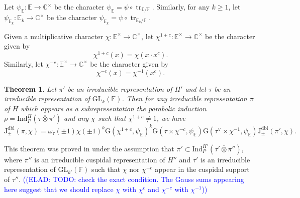\documentclass[12pt, reqno]{amsart}
\newtheorem{theorem}{Theorem}[section]
\theoremstyle{definition}
\theoremstyle{definition}
\theoremstyle{definition}
\newcommand{\cComplex}{\mathbb{C}}
\newcommand{\multiplicativegroup}[1]{#1^{\times}}
\newcommand{\fieldCharacter}{\psi}
\newcommand{\centralCharacter}[1]{\omega_{#1}}
\newcommand{\Ind}[3]{\mathrm{Ind}_{#1}^{#2}\left(#3\right)}
\newcommand{\Contragradient}[1]{#1^{\vee}}
\newcommand{\involution}[1]{#1^{c}}
\newcommand{\minusInvolution}[1]{#1^{-c}}
\newcommand{\involutionPlusOne}[1]{#1^{1+c}}
\newcommand{\trace}{\operatorname{tr}}
\newcommand{\GL}{\mathrm{GL}}
\newcommand{\finiteField}{\mathbb{F}}
\newcommand{\quadraticExtension}{\mathbb{E}}
\newcommand{\quadraticFieldExtension}[1]{\quadraticExtension_{#1}}
\newcommand{\GaussSumScalar}[2]{\mathrm{G}\left(#1, #2\right)}
\newcommand{\dblJacobiSumScalar}[2]{\mathrm{J}_{\pm}^{\mathrm{dbl}}\left(#1, #2\right)}
\newcommand{\elad}[1]{\textcolor{blue}{\sffamily ((ELAD: #1))}}
\begin{document}
Let $\fieldCharacter_{\quadraticExtension} \colon \quadraticExtension \to \multiplicativegroup{\cComplex}$ be the character  $\fieldCharacter_{\quadraticExtension} = \fieldCharacter \circ \trace_{\quadraticExtension \slash \finiteField}$. Similarly, for any $k \ge 1$, let $\fieldCharacter_{\quadraticFieldExtension{k}} \colon \quadraticFieldExtension{k} \to \multiplicativegroup{\cComplex}$ be the character $\fieldCharacter_{\quadraticFieldExtension{k}} = \fieldCharacter \circ \trace_{\quadraticFieldExtension{k} \slash \finiteField}$.

Given a multiplicative character $\chi \colon \multiplicativegroup{\quadraticExtension} \to \multiplicativegroup{\cComplex}$, let $\involutionPlusOne{\chi} \colon \multiplicativegroup{\quadraticExtension} \to \multiplicativegroup{\cComplex}$ be the character given by
$$\involutionPlusOne{\chi}\left(x\right) = \chi\left(x \cdot \involution{x}\right).$$ Similarly, let $\minusInvolution{\chi} \colon \multiplicativegroup{\quadraticExtension} \to \multiplicativegroup{\cComplex}$ be the character given by
$$\minusInvolution{\chi}\left(x\right) = \chi^{-1}\left(\involution{x}\right).$$

\begin{theorem}\label{thm:multiplicativity-in-terms-of-gauss-sums}
	Let $\pi'$ be an irreducible representation of $H'$ and let $\tau$ be an irreducible representation of $\GL_k\left(\quadraticExtension\right)$. Then for any irreducible representation $\pi$ of $H$ which appears as a subrepresentation the parabolic induction $\rho = \Ind{P}{H}{\tau \overline{\otimes} \pi'}$ and any $\chi$ such that $\involutionPlusOne{\chi} \ne 1$, we have
	$$\dblJacobiSumScalar{\pi}{\chi} = \centralCharacter{\tau}\left(\pm 1\right) \chi\left(\pm 1\right)^k \GaussSumScalar{\involutionPlusOne{\chi}}{\fieldCharacter_{\quadraticExtension}}^k \GaussSumScalar{\tau \times \minusInvolution{\chi}}{\fieldCharacter_{\quadraticExtension}} \GaussSumScalar{\Contragradient{\tau} \times \chi^{-1}}{\fieldCharacter_{\quadraticExtension}} \dblJacobiSumScalar{\pi'}{\chi}.$$
\end{theorem}

This theorem was proved in \cite{GirschZelingher2025} under the assumption that $\pi' \subset \Ind{P}{H'}{\tau' \overline{\otimes} \pi''}$, where $\pi''$ is an irreducible cuspidal representation of $H''$ and $\tau'$ is an irreducible representation of $\GL_{k'}\left(\finiteField\right)$ such that $\chi$ nor $\minusInvolution{\chi}$ appear in the cuspidal support of $\tau''$. \elad{TODO: check the exact condition. The Gauss sums appearing here suggest that we should replace $\chi$ with $\involution{\chi}$ and $\minusInvolution{\chi}$ with $\chi^{-1}$}
\end{document}
